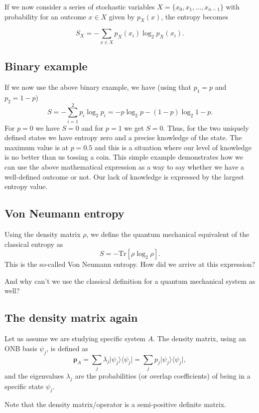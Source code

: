 \documentclass[%
oneside,                 %
final,                   %
10pt]{article}
\begin{document}
If we now consider a series of stochastic variables
$X=\{x_0,x_1,\dots,x_{n-1}\}$ with probability for an outcome $x\in X$
given by $p_X(x)$, the entropy becomes

\[
S_X = -\sum_{x\in X}p_X(x_i) \log_2{p_X(x_i)}.
\]

\subsection{Binary example}

If we now use the above binary example, we have (using that $p_1=p$ and $p_2=1-p$)
\[
S = -\sum_{i=1}^{2}p_i \log_2{p_i}=-p\log_2{p}-(1-p)\log_2{1-p}.
\]
For $p=0$ we have $S=0$ and for $p=1$ we get $S=0$. Thus, for the two
uniquely defined states we have entropy zero and a precise knowledge of the state. The maximum value is at
$p=0.5$ and this is a situation where our level of knowledge is no
better than us tossing a coin. This simple example demonstrates how we
can use the above mathematical expression as a way to say whether we
have a well-defined outcome or not. Our lack of knowledge is expressed
by the largest entropy value.

\subsection{Von Neumann entropy}

Using the density matrix $\rho$, we define the quantum mechanical equivalent of the classical entropy as 
\[
S=-\mathrm{Tr}[\rho\log_2{\rho}].
\]
This is the so-called Von Neumann entropy. How did we arrive at this expression? 

And why can't we use the classical definition for a quantum mechanical system as well?

\subsection{The density matrix again}

Let us assume we are studying specific system $A$. The density matrix,
using an ONB basis $\psi_j$, is defined as
\[
\bm{\rho}_A=\sum_j\lambda_j\vert \psi_j\rangle\langle \psi_j\vert=\sum_j p_j\vert \psi_j\rangle\langle \psi_j\vert,
\]
and the eigenvalues $\lambda_j$ are the probabilities (or overlap coefficients) of being in a
specific state $\psi_j$. 

Note that the density matrix/operator is a semi-positive definite matrix.
\end{document}
